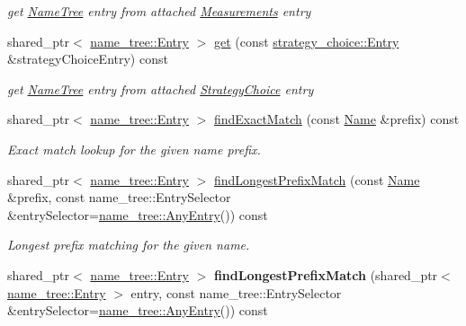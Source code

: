\begin{DoxyCompactItemize}
\begin{DoxyCompactList}\small\item\em get \hyperlink{classnfd_1_1NameTree}{Name\+Tree} entry from attached \hyperlink{classnfd_1_1Measurements}{Measurements} entry \end{DoxyCompactList}\item 
shared\+\_\+ptr$<$ \hyperlink{classnfd_1_1name__tree_1_1Entry}{name\+\_\+tree\+::\+Entry} $>$ \hyperlink{classnfd_1_1NameTree_ae9677eece1035045d2a8d2ef121f7115}{get} (const \hyperlink{classnfd_1_1strategy__choice_1_1Entry}{strategy\+\_\+choice\+::\+Entry} \&strategy\+Choice\+Entry) const\hypertarget{classnfd_1_1NameTree_ae9677eece1035045d2a8d2ef121f7115}{}\label{classnfd_1_1NameTree_ae9677eece1035045d2a8d2ef121f7115}

\begin{DoxyCompactList}\small\item\em get \hyperlink{classnfd_1_1NameTree}{Name\+Tree} entry from attached \hyperlink{classnfd_1_1StrategyChoice}{Strategy\+Choice} entry \end{DoxyCompactList}\item 
shared\+\_\+ptr$<$ \hyperlink{classnfd_1_1name__tree_1_1Entry}{name\+\_\+tree\+::\+Entry} $>$ \hyperlink{classnfd_1_1NameTree_a5dae86cf528e6b16650fe486f028df66}{find\+Exact\+Match} (const \hyperlink{classndn_1_1Name}{Name} \&prefix) const
\begin{DoxyCompactList}\small\item\em Exact match lookup for the given name prefix. \end{DoxyCompactList}\item 
shared\+\_\+ptr$<$ \hyperlink{classnfd_1_1name__tree_1_1Entry}{name\+\_\+tree\+::\+Entry} $>$ \hyperlink{classnfd_1_1NameTree_a153fa29e38116ec87b1f7862a2009bec}{find\+Longest\+Prefix\+Match} (const \hyperlink{classndn_1_1Name}{Name} \&prefix, const name\+\_\+tree\+::\+Entry\+Selector \&entry\+Selector=\hyperlink{structnfd_1_1name__tree_1_1AnyEntry}{name\+\_\+tree\+::\+Any\+Entry}()) const
\begin{DoxyCompactList}\small\item\em Longest prefix matching for the given name. \end{DoxyCompactList}\item 
shared\+\_\+ptr$<$ \hyperlink{classnfd_1_1name__tree_1_1Entry}{name\+\_\+tree\+::\+Entry} $>$ {\bfseries find\+Longest\+Prefix\+Match} (shared\+\_\+ptr$<$ \hyperlink{classnfd_1_1name__tree_1_1Entry}{name\+\_\+tree\+::\+Entry} $>$ entry, const name\+\_\+tree\+::\+Entry\+Selector \&entry\+Selector=\hyperlink{structnfd_1_1name__tree_1_1AnyEntry}{name\+\_\+tree\+::\+Any\+Entry}()) const\hypertarget{classnfd_1_1NameTree_a42b0a800b45adea4187ece88879bd519}{}\label{classnfd_1_1NameTree_a42b0a800b45adea4187ece88879bd519}


\end{DoxyCompactItemize}

